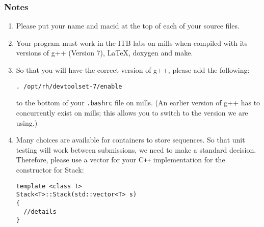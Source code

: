 \documentclass[12pt]{article}
\newcommand\CC{C\texttt{++}}
\begin{document}
\subsubsection*{Notes}

\begin{enumerate}
\item Please put your name and macid at the top of each of your source files.
\item Your program must work in the ITB labs on mills when compiled with its
  versions of g++ (Version 7), \LaTeX, doxygen and make.
\item So that you will have the correct version of g++, please add the
  following:

  \texttt{. /opt/rh/devtoolset-7/enable} 

  to the bottom of your \texttt{.bashrc} file on mills.  (An earlier version of
  g++ has to concurrently exist on mills; this allows you to switch to the
  version we are using.)
\item Many choices are available for containers to store sequences.  So
  that unit testing will work between submissions, we need to make a standard
  decision.  Therefore, please use a vector for your \CC{} implementation for the
  constructor for Stack:
\begin{lstlisting}
template <class T>
Stack<T>::Stack(std::vector<T> s)
{
  //details
}


\end{lstlisting}
\end{enumerate}
\end{document}
